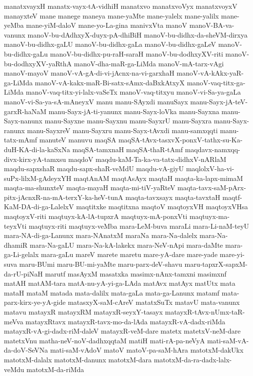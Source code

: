 {manatxvayxH
manatx-vayx-tA-vidhiH
manatxvo
manatxvoVyx
manatxvoyxV
manayxteV
mane
manege
maneya
mane-yaMte
mane-yalelx
mane-yalilx
mane-yeMba
mane-yiM-daloV
mane-yo-La-gina
manivxVta
manoV
manoV-BA-va-vanunx
manoV-bu-dAdhxyX-duyx-pA-dhiBiH
manoV-bu-didhx-da-sheVM-dirxya
manoV-bu-didhx-gaLU
manoV-bu-didhx-gaLa
manoV-bu-didhx-gaLeV
manoV-bu-didhx-gaLu
manoV-bu-didhx-pu-raH-saraH
manoV-bu-dodhxyXV-riti
manoV-bu-dodhxyXV-yaRthA
manoV-dha-maR-ga-LiMda
manoV-mA-tarx-vAgi
manoV-mayoV
manoV-vA-gA-di-vi-jAcnx-na-vi-garxhaH
manoV-vA-kAkx-yaR-ga-LiMda
manoV-vA-kakx-maR-Bi-satx-sAmx-daBxkAtxyX
manoV-vaq-titx-ga-LiMda
manoV-vaq-titx-yi-lalx-vaSeTx
manoV-vaq-titxyu
manoV-vi-Sa-ya-gaLa
manoV-vi-Sa-ya-sA-mAneyxV
manu
manu-SAyxdi
manuSayx
manu-Sayx-jA-teV-garxR-haNaM
manu-Sayx-jA-ti-yanunx
manu-Sayx-loVka
manu-Sayxna
manu-Sayx-nanunx
manu-Sayxne
manu-Sayxnu
manu-SayxrU
manu-Sayxra
manu-Sayx-ranunx
manu-SayxreV
manu-Sayxru
manu-Sayx-tAvxdi
manu-samxqqti
manu-tatx-mAmf
manuteV
manuvu
maqSA
maqSA-tAvx-tasxvX-ponxV-tathx-su-Ka-duH-KA-di-la-kaSxNa
maqSA-tamxnaH
maqSA-thaR-tAmf
maqdavx-namxqq-divx-kirx-yA-tamxsu
maqdoV
maqdu-kaM-Ta-ka-va-tatx-didhxV-nARlaM
maqdu-sapxshaR
maqdu-sapx-shaR-veMdU
maqdu-vA-giyU
maqlolxV-ha-vi-suPx-lilxM-gAdeyxYH
maqtAnAM
maqtAsAyx
maqtaH
maqta-ka-lapx-mimaM
maqta-ma-shunxteV
maqta-mayaH
maqta-mi-tiV-yaRteV
maqta-tavx-saM-pArx-pitx-jAcnxR-na-mA-terxY-ka-heV-tunA
maqta-tavxsayx
maqta-tavxtaH
maqtf-KaM-DA-di-ga-LalelxV
maqtitxke
maqtitxna
maqtoV
maqtoyxVH
maqtoyxVHsa
maqtoyxV-riti
maqtuyx-kA-lA-tupxrA
maqtuyx-mA-ponxVti
maqtuyx-ma-teyxVti
maqtuyx-riti
maqtuyx-veMba
mara-LeM-buva
maraLi
mara-Li-naM-teyU
mara-NA-di-ga-Lanunx
mara-NAnatxM
maraNa
mara-Na-dalelx
mara-Na-dhamiR
mara-Na-gaLU
mara-Na-kA-lakekx
mara-NeV-nApi
mara-daMte
mara-ga-Li-gelalx
mara-gaLu
mareV
marete
maretu
mare-yA-dare
mare-yade
mare-yi-suva
maru-BUmi
maru-BU-mi-yaMte
maru-parx-deV-shavu
maru-tapxrX-sapxM-da-rU-piNaH
marutf
masAyxM
masatxka
masimx-nAnx-tamxni
masimxnf
matAH
matAM-tara
matA-nu-yA-yi-ga-LAda
matAvx
matAyx
matUtx
mata
mataH
mataM
matada
mata-dalilx
mata-gaLa
mata-ga-Lanunx
matamf
mata-parx-kirx-ye-yA-gide
matasxyX-saM-cAreV
matatxSuTx
matavU
mata-vanunx
matavu
matayxR
matayxRM
matayxR-seyxY-tasayx
matayxR-tAvx-nUmx-taR-meVva
matayxRtavx
matayxR-tavx-mo-da-lAda
matayxR-vA-dadx-riMda
matayxR-vA-gi-dadx-riM-daleV
matayxR-veM-dare
matetx
matetxV-neM-dare
matetxVnu
matha-neV-noV-dadhxqqtaM
matiH
mati-rA-pa-neVyA
mati-saM-vA-da-doV-SeVNa
mati-saM-vAdoV
matoV
matoV-pa-saM-hAra
matotxM-dakUkx
matotxM-dalalx
matotxM-danunx
matotxM-dara
matotxM-da-ra-dadx-lalx-veMdu
matotxM-da-riMda
}
